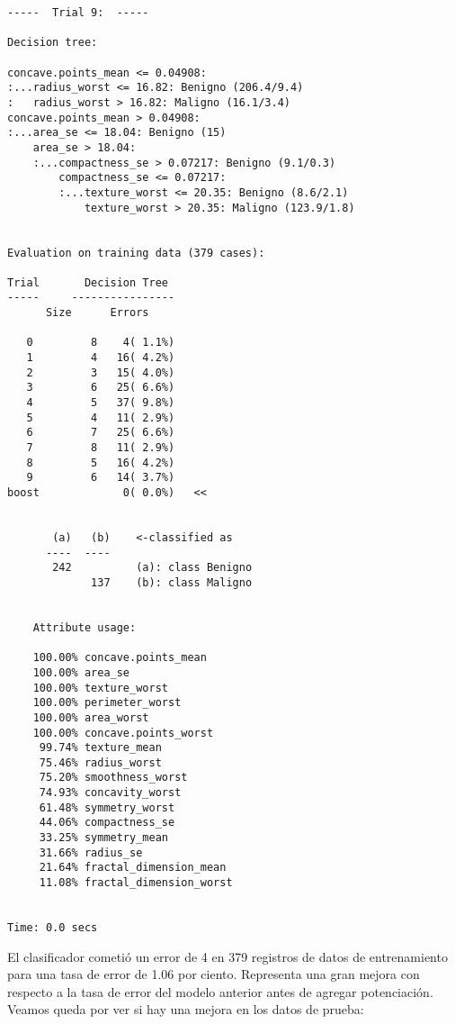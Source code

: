 \documentclass[
]{article}
\newenvironment{Shaded}{\begin{snugshade}}{\end{snugshade}}
\newcommand{\DataTypeTok}[1]{\textcolor[rgb]{0.13,0.29,0.53}{#1}}
\newcommand{\FloatTok}[1]{\textcolor[rgb]{0.00,0.00,0.81}{#1}}
\newcommand{\KeywordTok}[1]{\textcolor[rgb]{0.13,0.29,0.53}{\textbf{#1}}}
\newcommand{\NormalTok}[1]{#1}
\newcommand{\OperatorTok}[1]{\textcolor[rgb]{0.81,0.36,0.00}{\textbf{#1}}}
\newcommand{\StringTok}[1]{\textcolor[rgb]{0.31,0.60,0.02}{#1}}
\begin{document}
\begin{verbatim}
-----  Trial 9:  -----

Decision tree:

concave.points_mean <= 0.04908:
:...radius_worst <= 16.82: Benigno (206.4/9.4)
:   radius_worst > 16.82: Maligno (16.1/3.4)
concave.points_mean > 0.04908:
:...area_se <= 18.04: Benigno (15)
    area_se > 18.04:
    :...compactness_se > 0.07217: Benigno (9.1/0.3)
        compactness_se <= 0.07217:
        :...texture_worst <= 20.35: Benigno (8.6/2.1)
            texture_worst > 20.35: Maligno (123.9/1.8)


Evaluation on training data (379 cases):

Trial       Decision Tree   
-----     ----------------  
      Size      Errors  

   0         8    4( 1.1%)
   1         4   16( 4.2%)
   2         3   15( 4.0%)
   3         6   25( 6.6%)
   4         5   37( 9.8%)
   5         4   11( 2.9%)
   6         7   25( 6.6%)
   7         8   11( 2.9%)
   8         5   16( 4.2%)
   9         6   14( 3.7%)
boost             0( 0.0%)   <<


       (a)   (b)    <-classified as
      ----  ----
       242          (a): class Benigno
             137    (b): class Maligno


    Attribute usage:

    100.00% concave.points_mean
    100.00% area_se
    100.00% texture_worst
    100.00% perimeter_worst
    100.00% area_worst
    100.00% concave.points_worst
     99.74% texture_mean
     75.46% radius_worst
     75.20% smoothness_worst
     74.93% concavity_worst
     61.48% symmetry_worst
     44.06% compactness_se
     33.25% symmetry_mean
     31.66% radius_se
     21.64% fractal_dimension_mean
     11.08% fractal_dimension_worst


Time: 0.0 secs
\end{verbatim}

El clasificador cometió un error de 4 en 379 registros de datos de
entrenamiento para una tasa de error de 1.06 por ciento. Representa una
gran mejora con respecto a la tasa de error del modelo anterior antes de
agregar potenciación. Veamos queda por ver si hay una mejora en los
datos de prueba:

\begin{Shaded}
\end{Shaded}
\end{document}
